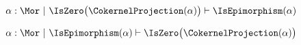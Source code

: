 \begin{sequent}
\begin{align*}
  \alpha: \Mor ~|~ \IsZero\big( \CokernelProjection( \alpha ) \big) \vdash \IsEpimorphism( \alpha )
\end{align*}
\end{sequent}

\begin{sequent}
\begin{align*}
  \alpha: \Mor ~|~  \IsEpimorphism( \alpha ) \vdash \IsZero\big( \CokernelProjection( \alpha ) \big)
\end{align*}
\end{sequent}
